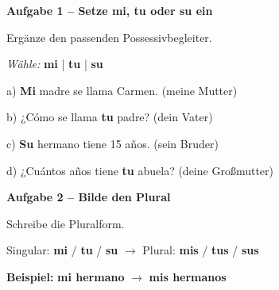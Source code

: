 \documentclass[11pt, a4paper]{article}
\newcommand{\fachfarbe}{spanisch}
\newcommand{\punktebox}[1]{\hfill\fbox{\small \_/#1}}
\newcommand{\lsg}[1]{\textcolor{loesung}{\textbf{#1}}}
\newenvironment{aufgabe}[1]{%
    \needspace{5\baselineskip}%
    \nopagebreak[4]%
    \vspace{10pt}
    \noindent\textbf{\textcolor{\fachfarbe}{Aufgabe #1}}
    \nopagebreak[4]%
    \vspace{5pt}
    \nopagebreak[4]%
    \begin{list}{}{\leftmargin=0pt}
    \item[]
}{%
    \end{list}
}
\newcommand{\es}[1]{\textcolor{\fachfarbe}{\textbf{#1}}}
\begin{document}
\vspace{10pt}


\begin{aufgabe}{1 -- Setze mi, tu oder su ein}
Ergänze den passenden Possessivbegleiter. \punktebox{4}
\end{aufgabe}

\begin{vokabelkasten}
\textit{Wähle:} \es{mi} | \es{tu} | \es{su}
\end{vokabelkasten}

\vspace{0.5em}

\noindent
a) \lsg{Mi} madre se llama Carmen. (meine Mutter)

\vspace{0.8em}

\noindent
b) ¿Cómo se llama \lsg{tu} padre? (dein Vater)

\vspace{0.8em}

\noindent
c) \lsg{Su} hermano tiene 15 años. (sein Bruder)

\vspace{0.8em}

\noindent
d) ¿Cuántos años tiene \lsg{tu} abuela? (deine Großmutter)

\vspace{15pt}


\begin{aufgabe}{2 -- Bilde den Plural}
Schreibe die Pluralform. \punktebox{4}
\end{aufgabe}

\begin{hinweis}
Singular: \es{mi} / \es{tu} / \es{su} $\rightarrow$ Plural: \es{mis} / \es{tus} / \es{sus}
\end{hinweis}

\vspace{0.5em}

\noindent
\textbf{Beispiel:} \es{mi hermano} $\rightarrow$ \es{mis hermanos}

\vspace{1em}
\end{document}

